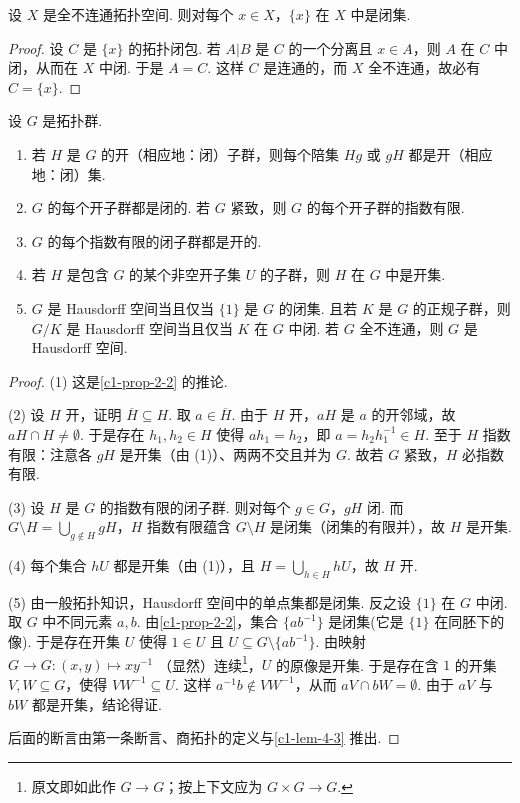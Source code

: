 \begin{lemma}\label{c1-lem-4-3}
设 $X$ 是全不连通拓扑空间. 则对每个 $x\in X$，$\{x\}$ 在 $X$ 中是闭集.
\end{lemma}

\begin{proof}
设 $C$ 是 $\{x\}$ 的拓扑闭包. 若 $A|B$ 是 $C$ 的一个分离且 $x\in A$，则 $A$ 在 $C$ 中闭，从而在 $X$ 中闭. 于是 $A=C$. 这样 $C$ 是连通的，而 $X$ 全不连通，故必有 $C=\{x\}$.
\end{proof}

\begin{proposition}\label{c1-prop-4-4}
设 $G$ 是拓扑群.
\begin{enumerate}[label=(\arabic*),leftmargin=*]
    \item 若 $H$ 是 $G$ 的开（相应地：闭）子群，则每个陪集 $Hg$ 或 $gH$ 都是开（相应地：闭）集.
    \item $G$ 的每个开子群都是闭的. 若 $G$ 紧致，则 $G$ 的每个开子群的指数有限.
    \item $G$ 的每个指数有限的闭子群都是开的.
    \item 若 $H$ 是包含 $G$ 的某个非空开子集 $U$ 的子群，则 $H$ 在 $G$ 中是开集.
    \item $G$ 是 Hausdorff 空间当且仅当 $\{1\}$ 是 $G$ 的闭集. 且若 $K$ 是 $G$ 的正规子群，则 $G/K$ 是 Hausdorff 空间当且仅当 $K$ 在 $G$ 中闭. 若 $G$ 全不连通，则 $G$ 是 Hausdorff 空间.
\end{enumerate}
\end{proposition}

\begin{proof}
(1) 这是\autoref{c1-prop-2-2} 的推论.

(2) 设 $H$ 开，证明 $\overline{H}\subseteq H$. 取 $a\in\overline{H}$. 由于 $H$ 开，$aH$ 是 $a$ 的开邻域，故 $aH\cap H\neq\emptyset$. 于是存在 $h_{1},h_{2}\in H$ 使得 $ah_{1}=h_{2}$，即 $a=h_{2}h_{1}^{-1}\in H$. 至于 $H$ 指数有限：注意各 $gH$ 是开集（由 (1)）、两两不交且并为 $G$. 故若 $G$ 紧致，$H$ 必指数有限.

(3) 设 $H$ 是 $G$ 的指数有限的闭子群. 则对每个 $g\in G$，$gH$ 闭. 而 $G\setminus H=\bigcup_{g\notin H}gH$，$H$ 指数有限蕴含 $G\setminus H$ 是闭集（闭集的有限并），故 $H$ 是开集.

(4) 每个集合 $hU$ 都是开集（由 (1)），且 $H=\bigcup_{h\in H}hU$，故 $H$ 开.

(5) 由一般拓扑知识，Hausdorff 空间中的单点集都是闭集. 反之设 $\{1\}$ 在 $G$ 中闭. 取 $G$ 中不同元素 $a,b$. 由\autoref{c1-prop-2-2}，集合 $\{ab^{-1}\}$ 是闭集(它是 $\{1\}$ 在同胚下的像). 于是存在开集 $U$ 使得 $1\in U$ 且 $U\subseteq G\setminus\{ab^{-1}\}$. 由映射 $G\to G:(x,y)\mapsto xy^{-1}$ （显然）连续\footnote{原文即如此作 $G\to G$；按上下文应为 $G\times G\to G$.}，$U$ 的原像是开集. 于是存在含 $1$ 的开集 $V,W\subseteq G$，使得 $VW^{-1}\subseteq U$. 这样 $a^{-1}b\notin VW^{-1}$，从而 $aV\cap bW=\emptyset$. 由于 $aV$ 与 $bW$ 都是开集，结论得证.

后面的断言由第一条断言、商拓扑的定义与\autoref{c1-lem-4-3} 推出.
\end{proof}


